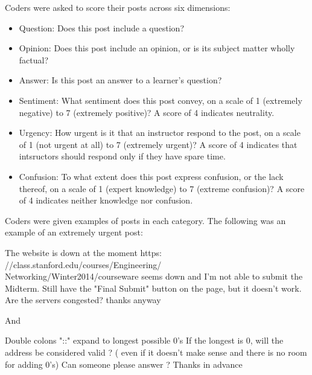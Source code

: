 \documentclass{edm_template}
\begin{document}
Coders were asked to score their posts across six dimensions:
\begin{itemize}
\vspace{-15pt}
       \setlength\itemsep{0.05em}
       \item Question: Does this post include a question?
       \item Opinion: Does this post include an opinion, or is its subject matter wholly factual?
       \item Answer: Is this post an answer to a learner's question?
       \item Sentiment: What sentiment does this post convey, on a scale of 1 (extremely negative) to 7 (extremely positive)? A score of 4 indicates neutrality.
       \item Urgency: How urgent is it that an instructor respond to the post, on a scale of 1 (not urgent at all) to 7 (extremely urgent)? A score of 4 indicates that intsructors should respond only if they have spare time.
       \item Confusion: To what extent does this post express confusion, or the lack thereof, on a scale of 1 (expert knowledge) to 7 (extreme confusion)? A score of 4 indicates neither knowledge nor confusion.
\end{itemize}
\vspace{-15pt}
Coders were given examples of posts in each category. The following was an example of an extremely urgent post:

\vspace{-14pt}
\begin{displayquote}
The website is down at the moment
       https:\\//class.stanford.edu/courses/Engineering/\\Networking/Winter2014/courseware
       seems down and I'm not able to submit the Midterm. Still have
       the "Final Submit" button on the page, but it doesn't work. Are
       the servers congested? 
       thanks anyway
\end{displayquote}
\vspace{-14pt}

And

\vspace{-14pt}
\begin{displayquote}
Double colons "::"  expand to longest possible 0's  
       If the longest is 0, will  the address be considered valid ?  (
       even if it doesn't make sense and there is no room for adding
       0's) 
       Can someone please answer ?
       Thanks in advance
\end{displayquote}
\vspace{-14pt}
\end{document}

